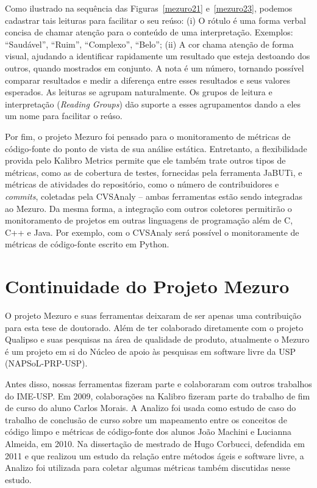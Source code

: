 Como ilustrado na sequência das Figuras~\ref{mezuro21} e~\ref{mezuro23},
podemos cadastrar tais leituras para facilitar o seu reúso:
%
(i) O rótulo é uma forma verbal concisa de chamar atenção para o conteúdo de uma
interpretação. Exemplos: ``Saudável'', ``Ruim'', ``Complexo'', ``Belo'';
%
(ii) A cor chama atenção de forma visual, ajudando a identificar rapidamente
um resultado que esteja destoando dos outros, quando mostrados em conjunto.
%
A nota é um número, tornando possível comparar resultados e medir
a diferença entre esses resultados e seus valores esperados.
%
As leituras se agrupam naturalmente. Os grupos de leitura e interpretação
(\textit{Reading Groups}) dão suporte a esses agrupamentos dando a eles um nome
para facilitar o reúso.

Por fim, o projeto Mezuro foi pensado para o monitoramento de métricas de código-fonte
do ponto de vista de sua análise estática.
%
Entretanto, a flexibilidade provida pelo Kalibro Metrics permite que ele também
trate outros tipos de métricas, como as de cobertura de testes, fornecidas pela
ferramenta JaBUTi, e métricas de atividades do repositório, como o número de
contribuidores e \textit{commits}, coletadas pela CVSAnaly -- ambas ferramentas
estão sendo integradas ao Mezuro.
%
Da mesma forma, a integração com outros coletores permitirão o monitoramento de
projetos em outras linguagens de programação além de C, C++ e Java.
%
Por exemplo, com o CVSAnaly será possível o monitoramente de métricas de código-fonte
escrito em Python.


\section{Continuidade do Projeto Mezuro}


O projeto Mezuro e suas ferramentas deixaram de ser apenas uma contribuição
para esta tese de doutorado.
%
Além de ter colaborado diretamente com o projeto Qualipso e suas pesquisas
na área de qualidade de produto, atualmente o Mezuro é um projeto em si
do Núcleo de apoio às pesquisas em software livre da USP (NAPSoL-PRP-USP).

Antes disso, nossas ferramentas fizeram parte e colaboraram com outros trabalhos
do IME-USP.
%
Em 2009, colaborações na Kalibro fizeram parte do trabalho de 
fim de curso do aluno Carlos Morais.
%
A Analizo foi usada como estudo de caso do trabalho de conclusão de 
curso sobre um mapeamento entre os conceitos de código limpo e métricas de
código-fonte dos alunos João Machini e Lucianna Almeida, em 2010.
%
Na dissertação de mestrado de Hugo Corbucci, defendida em 2011 e que realizou
um estudo da relação entre métodos ágeis e software livre, a Analizo foi
utilizada para coletar algumas métricas também discutidas nesse estudo.


